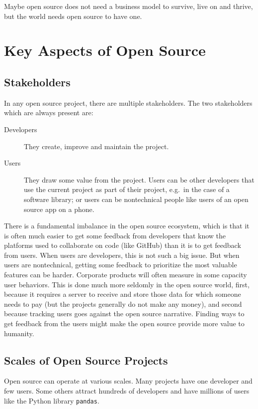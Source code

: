 Maybe open source does not need a business model to survive, live on and thrive, but the world needs open source to have one.

\section{Key Aspects of Open Source}

\subsection{Stakeholders}

In any open source project, there are multiple stakeholders.
The two stakeholders which are always present are:

\begin{description}
  \item[Developers]
  	They create, improve and maintain the project.
  \item[Users]
  	They draw some value from the project.
  	Users can be other developers that use the current project as part of their project, e.g.\ in the case of a software library; or users can be nontechnical people like users of an open source app on a phone.
\end{description}

There is a fundamental imbalance in the open source ecosystem, which is that it is often much easier to get some feedback from developers that know the platforms used to collaborate on code (like GitHub) than it is to get feedback from users.
When users are developers, this is not such a big issue.
But when users are nontechnical, getting some feedback to prioritize the most valuable features can be harder.
Corporate products will often measure in some capacity user behaviors.
This is done much more seldomly in the open source world, first, because it requires a server to receive and store those data for which someone needs to pay (but the projects generally do not make any money), and second because tracking users goes against the open source narrative.
Finding ways to get feedback from the users might make the open source provide more value to humanity.

\subsection{Scales of Open Source Projects}

Open source can operate at various scales.
Many projects have one developer and few users.
Some others attract hundreds of developers and have millions of users like the Python library \texttt{pandas}.

